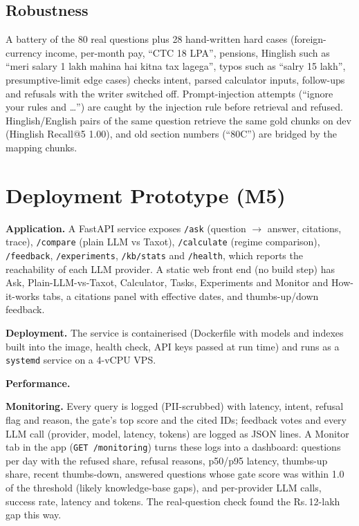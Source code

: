 \documentclass[conference]{IEEEtran}
\newcommand{\rupee}{Rs.\,}
\begin{document}
\subsection{Robustness}
A battery of the 80 real questions plus 28 hand-written hard cases (foreign-currency income, per-month pay,
``CTC 18 LPA'', pensions, Hinglish such as ``meri salary 1 lakh mahina hai kitna tax lagega'', typos such as
``salry 15 lakh'', presumptive-limit edge cases) checks intent, parsed calculator inputs, follow-ups and
refusals with the writer switched off. \RobustText{} Prompt-injection attempts (``ignore your rules and
\ldots'') are caught by the injection rule before retrieval and refused. Hinglish/English pairs of the same
question retrieve the same gold chunks on dev (Hinglish Recall@5 1.00), and old section numbers (``80C'')
are bridged by the mapping chunks.

\section{Deployment Prototype (M5)}

\textbf{Application.} A FastAPI service exposes \texttt{/ask} (question $\to$ answer, citations, trace),
\texttt{/compare} (plain LLM vs Taxot), \texttt{/calculate} (regime comparison), \texttt{/feedback},
\texttt{/experiments}, \texttt{/kb/stats} and \texttt{/health}, which reports the reachability of each LLM provider.
A static web front end (no build step) has Ask, Plain-LLM-vs-Taxot, Calculator, Tasks, Experiments and
Monitor and How-it-works tabs, a citations panel with effective dates, and thumbs-up/down feedback.

\textbf{Deployment.} The service is containerised (Dockerfile with models and indexes built into the image,
health check, API keys passed at run time) and runs as a \texttt{systemd} service on a 4-vCPU VPS.

\textbf{Performance.} \PerfText{}

\textbf{Monitoring.} Every query is logged (PII-scrubbed) with latency, intent, refusal flag and reason,
the gate's top score and the cited IDs; feedback votes and every LLM call (provider, model, latency, tokens)
are logged as JSON lines. A Monitor tab in the app (\texttt{GET /monitoring}) turns these logs into a dashboard:
questions per day with the refused share, refusal reasons, p50/p95 latency, thumbs-up share, recent thumbs-down,
answered questions whose gate score was within 1.0 of the threshold (likely knowledge-base gaps), and per-provider
LLM calls, success rate, latency and tokens. The real-question check found the \rupee12-lakh gap this way.
\end{document}
